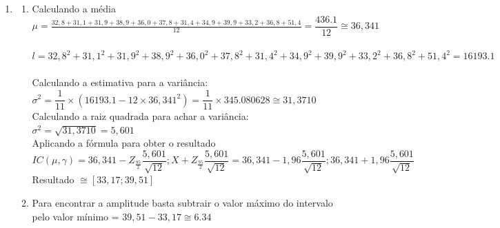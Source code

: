 \documentclass[a4paper, 12pt]{article}
\begin{document}
\begin{enumerate}
\begin{enumerate}
\end{enumerate}

\item \begin{enumerate}
\item Calculando a média\\ $\mu = \frac{32,8 + 31,1 + 31,9 + 38,9 + 36,0 + 37, 8 + 31,4 + 34,9 + 39, 9 + 33, 2 + 36,8 + 51,4}{12} =  \dfrac{436.1}{12} \cong  36,341$ \\ \\ 

$ l = 32,8^2 + 31,1^2 + 31,9^2 + 38,9^2 + 36,0^2 + 37,8^2 + 31,4^2 + 34,9^2 + 39,9^2 + 33,2^2 + 36,8^2 + 51,4^2 = 16193.1 $ \\ \\
Calculando a estimativa para a variância: \\  $\sigma^2 = \dfrac{1}{11} \times (16193.1 - 12 \times 36,341^2) = \dfrac{1}{11} \times 345.080628 \cong 31,3710$\\
Calculando a raiz quadrada para achar a variância: $\sigma^2 = \sqrt{31,3710} = 5,601$ \\
Aplicando a fórmula para obter o resultado
$IC(\mu, \gamma) = 36,341 - Z_{\frac{95}{2}}\dfrac{5,601}{\sqrt{12}}; X +Z_{\frac{95}{2}}\dfrac{5,601}{\sqrt{12}} = 36,341 - 1,96\dfrac{5,601}{\sqrt{12}}; 36,341 + 1,96 \dfrac{5,601}{\sqrt{12}} $
Resultado $\cong [33,17; 39,51]$

\item Para encontrar a amplitude basta subtrair o valor máximo do intervalo pelo valor mínimo = $39,51 - 33,17 \cong 6.34 $
\end{enumerate}

\end{enumerate}

 
\end{document}

